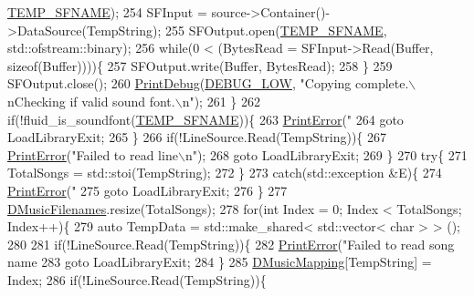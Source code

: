 \begin{DoxyCode}
{{{{{{      \hyperlink{SoundLibraryMixer_8cpp_a1ba6e33012d926b97ef45f11d1f703ac}{TEMP\_SFNAME});
254         SFInput = source->Container()->DataSource(TempString);
255         SFOutput.open(\hyperlink{SoundLibraryMixer_8cpp_a1ba6e33012d926b97ef45f11d1f703ac}{TEMP\_SFNAME}, std::ofstream::binary);    
256         \textcolor{keywordflow}{while}(0 < (BytesRead = SFInput->Read(Buffer, \textcolor{keyword}{sizeof}(Buffer))))\{
257             SFOutput.write(Buffer, BytesRead);
258         \}
259         SFOutput.close();
260         \hyperlink{Debug_8h_aa5f00f5537c9760f6ae1782460748ab9}{PrintDebug}(\hyperlink{Debug_8h_a3a5f3fc09784650d8388cb854882f840}{DEBUG\_LOW}, \textcolor{stringliteral}{"Copying complete.\(\backslash\)nChecking if valid sound font.\(\backslash\)n"});
261     \}
262     \textcolor{keywordflow}{if}(!fluid\_is\_soundfont(\hyperlink{SoundLibraryMixer_8cpp_a1ba6e33012d926b97ef45f11d1f703ac}{TEMP\_SFNAME}))\{
263         \hyperlink{Debug_8h_a2ed825eefefe35baf59a93a8c641323d}{PrintError}(\textcolor{stringliteral}{"%
264         \textcolor{keywordflow}{goto} LoadLibraryExit;
265     \}
266     \textcolor{keywordflow}{if}(!LineSource.Read(TempString))\{
267         \hyperlink{Debug_8h_a2ed825eefefe35baf59a93a8c641323d}{PrintError}(\textcolor{stringliteral}{"Failed to read line\(\backslash\)n"});
268         \textcolor{keywordflow}{goto} LoadLibraryExit;
269     \}
270     \textcolor{keywordflow}{try}\{
271         TotalSongs = std::stoi(TempString);
272     \}
273     \textcolor{keywordflow}{catch}(std::exception &E)\{
274         \hyperlink{Debug_8h_a2ed825eefefe35baf59a93a8c641323d}{PrintError}(\textcolor{stringliteral}{"%
275         \textcolor{keywordflow}{goto} LoadLibraryExit;
276     \}
277     \hyperlink{classCSoundLibraryMixer_a105a9c5d911492518ac706039bf1de16}{DMusicFilenames}.resize(TotalSongs);
278     \textcolor{keywordflow}{for}(\textcolor{keywordtype}{int} Index = 0; Index < TotalSongs; Index++)\{
279         \textcolor{keyword}{auto} TempData = std::make\_shared< std::vector< char > > ();
280         
281         \textcolor{keywordflow}{if}(!LineSource.Read(TempString))\{
282             \hyperlink{Debug_8h_a2ed825eefefe35baf59a93a8c641323d}{PrintError}(\textcolor{stringliteral}{"Failed to read song name %
283             \textcolor{keywordflow}{goto} LoadLibraryExit;
284         \}    
285         \hyperlink{classCSoundLibraryMixer_ada2510450315651ebe948ce63960b98a}{DMusicMapping}[TempString] = Index;
286         \textcolor{keywordflow}{if}(!LineSource.Read(TempString))\{
}}}}}}}}}
\end{DoxyCode}
